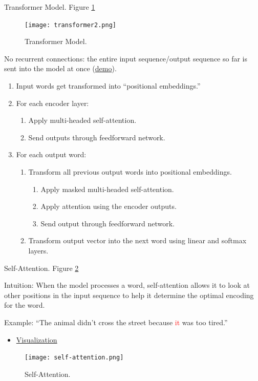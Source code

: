 \documentclass[english]{article}
\begin{document}
\item 
 {Transformer Model}.  Figure \ref{Transformer Model}

\begin{figure}
\centering
\texttt{[image: transformer2.png]}
    \caption{Transformer Model.}
    \label{Transformer Model}
\end{figure} 


No recurrent connections: the entire input sequence/output sequence so far is sent into the model at once (\href{https://ai.googleblog.com/2017/08/transformer-novel-neural-network.html}{demo}).
 
\begin{enumerate}
\item Input words get transformed into ``positional embeddings.''
\item For each encoder layer:
\begin{enumerate}
\item Apply multi-headed self-attention.
\item Send outputs through feedforward network.
\end{enumerate}
\item For each output word:
\begin{enumerate}
\item Transform all previous output words into positional embeddings.
\begin{enumerate}
\item Apply masked multi-headed self-attention.
\item Apply attention using the encoder outputs.
\item Send output through feedforward network.
\end{enumerate}
\item Transform output vector into the next word using linear and softmax layers.
\end{enumerate}
\end{enumerate}
 

\item 
 {Self-Attention}.  Figure \ref{Self-Attention}

Intuition: When the model processes a word, self-attention allows it to look at other positions in the input sequence to help it determine the optimal encoding for the word.
 
Example: ``The animal didn't cross the street because \textcolor{red}{it} was too tired.''
\begin{itemize}
\item
\href{https://colab.research.google.com/github/tensorflow/tensor2tensor/blob/master/tensor2tensor/notebooks/hello_t2t.ipynb}{Visualization}
\end{itemize}
\begin{figure}
\centering
\texttt{[image: self-attention.png]}
    \caption{Self-Attention.}
    \label{Self-Attention}
\end{figure}
 
\end{document}
